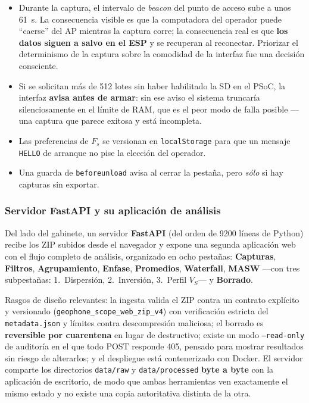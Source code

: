 \begin{itemize}[itemsep=0.2em]
    \item Durante la captura, el intervalo de \emph{beacon} del punto de acceso sube a
    unos \SI{61}{\second}. La consecuencia visible es que la computadora del operador
    puede ``caerse'' del AP mientras la captura corre; la consecuencia real es que
    \textbf{los datos siguen a salvo en el ESP} y se recuperan al reconectar. Priorizar
    el determinismo de la captura sobre la comodidad de la interfaz fue una decisi\'on
    consciente.
    \item Si se solicitan m\'as de 512 lotes sin haber habilitado la SD en el PSoC, la
    interfaz \textbf{avisa antes de armar}: sin ese aviso el sistema truncar\'ia
    silenciosamente en el l\'imite de RAM, que es el peor modo de falla posible ---una
    captura que parece exitosa y est\'a incompleta.
    \item Las preferencias de $F_s$ se versionan en \texttt{localStorage} para que un
    mensaje \texttt{HELLO} de arranque no pise la elecci\'on del operador.
    \item Una guarda de \texttt{beforeunload} avisa al cerrar la pesta\~na, pero
    \emph{s\'olo} si hay capturas sin exportar.
\end{itemize}

\subsubsection{Servidor FastAPI y su aplicaci\'on de an\'alisis}

Del lado del gabinete, un servidor \textbf{FastAPI} (del orden de \num{9200} l\'ineas de
Python) recibe los ZIP subidos desde el navegador y expone una segunda aplicaci\'on web
con el flujo completo de an\'alisis, organizado en ocho pesta\~nas:
\textbf{Capturas}, \textbf{Filtros}, \textbf{Agrupamiento}, \textbf{Enfase},
\textbf{Promedios}, \textbf{Waterfall}, \textbf{MASW} ---con tres subpesta\~nas:
1.~Dispersi\'on, 2.~Inversi\'on, 3.~Perfil $V_S$--- y \textbf{Borrado}.

Rasgos de dise\~no relevantes: la ingesta valida el ZIP contra un contrato explícito y
versionado (\texttt{geophone\_scope\_web\_zip\_v4}) con verificaci\'on estricta del
\texttt{metadata.json} y l\'imites contra descompresi\'on maliciosa; el borrado es
\textbf{reversible por cuarentena} en lugar de destructivo; existe un modo
\texttt{--read-only} de auditor\'ia en el que todo POST responde 405, pensado para
mostrar resultados sin riesgo de alterarlos; y el despliegue est\'a contenerizado con
Docker. El servidor comparte los directorios \texttt{data/raw} y \texttt{data/processed}
\textbf{byte a byte} con la aplicaci\'on de escritorio, de modo que ambas herramientas ven
exactamente el mismo estado y no existe una copia autoritativa distinta de la otra.

